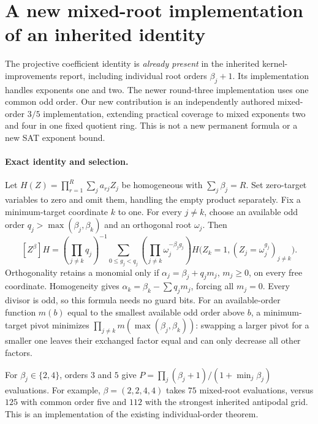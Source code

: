 \documentclass[11pt,letterpaper]{article}
\theoremstyle{remark}\newtheorem{remark}[theorem]{Remark}
\begin{document}
\section{A new mixed-root implementation of an inherited identity}
\label{sec:mixedroots}
The projective coefficient identity is \emph{already present} in the
inherited kernel-improvements report, including individual root orders
$\beta_j+1$. Its implementation handles exponents one and two. The newer
round-three implementation uses one common odd order. Our new contribution
is an independently authored mixed-order $3/5$ implementation, extending
practical coverage to mixed exponents two and four in one fixed quotient
ring. This is not a new permanent formula or a new SAT exponent bound.

\paragraph{Exact identity and selection.}
Let $H(Z)=\prod_{r=1}^R\sum_j a_{rj}Z_j$ be homogeneous with
$\sum_j\beta_j=R$. Set zero-target variables to zero and omit them, handling
the empty product separately. Fix a minimum-target coordinate $k$ to one.
For every $j\ne k$, choose an available odd order
$q_j>\max(\beta_j,\beta_k)$ and an orthogonal root $\omega_j$. Then
\[
 [Z^\beta]H=
 \left(\prod_{j\ne k}q_j\right)^{-1}
 \sum_{0\le g_j<q_j}
 \left(\prod_{j\ne k}\omega_j^{-\beta_jg_j}\right)
 H\bigl(Z_k=1,(Z_j=\omega_j^{g_j})_{j\ne k}\bigr).
\]
Orthogonality retains a monomial only if
$\alpha_j=\beta_j+q_jm_j$, $m_j\ge0$, on every free coordinate.
Homogeneity gives $\alpha_k=\beta_k-\sum q_jm_j$, forcing all $m_j=0$.
Every divisor is odd, so this formula needs no guard bits.
For an available-order function $m(b)$ equal to the smallest available odd
order above $b$, a minimum-target pivot minimizes
$\prod_{j\ne k}m(\max(\beta_j,\beta_k))$: swapping a larger pivot for a
smaller one leaves their exchanged factor equal and can only decrease
all other factors.

For $\beta_j\in\{2,4\}$, orders $3$ and $5$ give
$P=\prod_j(\beta_j+1)/(1+\min_j\beta_j)$ evaluations. For example,
$\beta=(2,2,4,4)$ takes $75$ mixed-root evaluations, versus $125$ with
common order five and $112$ with the strongest inherited antipodal grid.
This is an implementation of the existing individual-order theorem.
\end{document}
